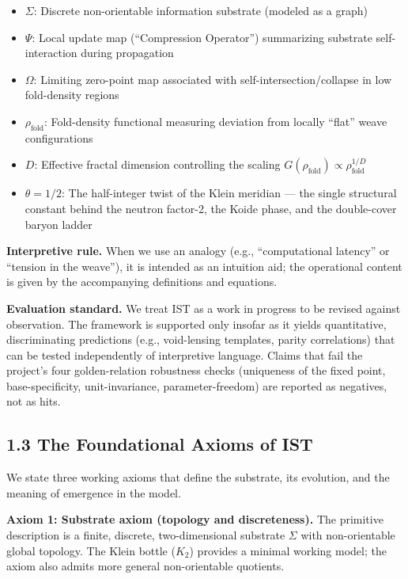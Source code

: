 \documentclass[
  11pt,
]{article}
\providecommand{\tightlist}{%
  \setlength{\itemsep}{0pt}\setlength{\parskip}{0pt}}
\begin{document}
\begin{itemize}
\tightlist
\item
  \textbf{\(\Sigma\)}: Discrete non-orientable information substrate
  (modeled as a graph)
\item
  \textbf{\(\Psi\)}: Local update map (``Compression Operator'')
  summarizing substrate self-interaction during propagation
\item
  \textbf{\(\Omega\)}: Limiting zero-point map associated with
  self-intersection/collapse in low fold-density regions
\item
  \textbf{\(\rho_{\text{fold}}\)}: Fold-density functional measuring
  deviation from locally ``flat'' weave configurations
\item
  \textbf{\(D\)}: Effective fractal dimension controlling the scaling
  \(G(\rho_{\text{fold}}) \propto \rho_{\text{fold}}^{1/D}\)
\item
  \textbf{\(\theta = 1/2\)}: The half-integer twist of the Klein
  meridian --- the single structural constant behind the neutron
  factor-2, the Koide phase, and the double-cover baryon ladder
\end{itemize}

\textbf{Interpretive rule.} When we use an analogy (e.g.,
``computational latency'' or ``tension in the weave''), it is intended
as an intuition aid; the operational content is given by the
accompanying definitions and equations.

\textbf{Evaluation standard.} We treat IST as a work in progress to be
revised against observation. The framework is supported only insofar as
it yields quantitative, discriminating predictions (e.g., void-lensing
templates, parity correlations) that can be tested independently of
interpretive language. Claims that fail the project's four
golden-relation robustness checks (uniqueness of the fixed point,
base-specificity, unit-invariance, parameter-freedom) are reported as
negatives, not as hits.

\subsection{1.3 The Foundational Axioms of
IST}\label{the-foundational-axioms-of-ist}

We state three working axioms that define the substrate, its evolution,
and the meaning of emergence in the model.

\textbf{Axiom 1: Substrate axiom (topology and discreteness).} The
primitive description is a finite, discrete, two-dimensional substrate
\(\Sigma\) with non-orientable global topology. The Klein bottle
(\(K_2\)) provides a minimal working model; the axiom also admits more
general non-orientable quotients.
\end{document}
